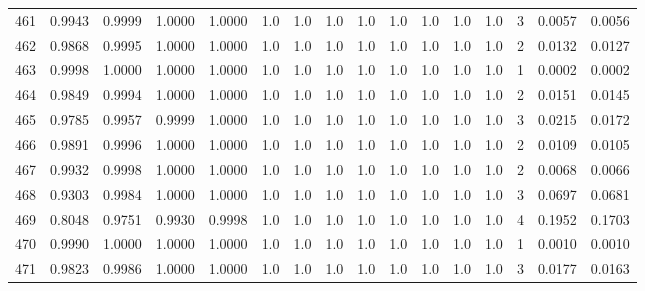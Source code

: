 \begin{tabular}{lrrrrrrrrrrrrrrr}
461 &      0.9943 &  0.9999 &  1.0000 &  1.0000 &     1.0 &     1.0 &     1.0 &     1.0 &     1.0 &     1.0 &      1.0 &        1.0 &      3 &                    0.0057 &                     0.0056 \\
462 &      0.9868 &  0.9995 &  1.0000 &  1.0000 &     1.0 &     1.0 &     1.0 &     1.0 &     1.0 &     1.0 &      1.0 &        1.0 &      2 &                    0.0132 &                     0.0127 \\
463 &      0.9998 &  1.0000 &  1.0000 &  1.0000 &     1.0 &     1.0 &     1.0 &     1.0 &     1.0 &     1.0 &      1.0 &        1.0 &      1 &                    0.0002 &                     0.0002 \\
464 &      0.9849 &  0.9994 &  1.0000 &  1.0000 &     1.0 &     1.0 &     1.0 &     1.0 &     1.0 &     1.0 &      1.0 &        1.0 &      2 &                    0.0151 &                     0.0145 \\
465 &      0.9785 &  0.9957 &  0.9999 &  1.0000 &     1.0 &     1.0 &     1.0 &     1.0 &     1.0 &     1.0 &      1.0 &        1.0 &      3 &                    0.0215 &                     0.0172 \\
466 &      0.9891 &  0.9996 &  1.0000 &  1.0000 &     1.0 &     1.0 &     1.0 &     1.0 &     1.0 &     1.0 &      1.0 &        1.0 &      2 &                    0.0109 &                     0.0105 \\
467 &      0.9932 &  0.9998 &  1.0000 &  1.0000 &     1.0 &     1.0 &     1.0 &     1.0 &     1.0 &     1.0 &      1.0 &        1.0 &      2 &                    0.0068 &                     0.0066 \\
468 &      0.9303 &  0.9984 &  1.0000 &  1.0000 &     1.0 &     1.0 &     1.0 &     1.0 &     1.0 &     1.0 &      1.0 &        1.0 &      3 &                    0.0697 &                     0.0681 \\
469 &      0.8048 &  0.9751 &  0.9930 &  0.9998 &     1.0 &     1.0 &     1.0 &     1.0 &     1.0 &     1.0 &      1.0 &        1.0 &      4 &                    0.1952 &                     0.1703 \\
470 &      0.9990 &  1.0000 &  1.0000 &  1.0000 &     1.0 &     1.0 &     1.0 &     1.0 &     1.0 &     1.0 &      1.0 &        1.0 &      1 &                    0.0010 &                     0.0010 \\
471 &      0.9823 &  0.9986 &  1.0000 &  1.0000 &     1.0 &     1.0 &     1.0 &     1.0 &     1.0 &     1.0 &      1.0 &        1.0 &      3 &                    0.0177 &                     0.0163 \\

\end{tabular}
